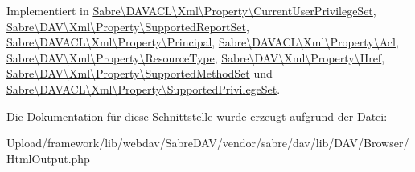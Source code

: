 Implementiert in \mbox{\hyperlink{class_sabre_1_1_d_a_v_a_c_l_1_1_xml_1_1_property_1_1_current_user_privilege_set_ab15d2dbb957c67a5a58b5d93f4a47bfd}{Sabre\textbackslash{}\+D\+A\+V\+A\+C\+L\textbackslash{}\+Xml\textbackslash{}\+Property\textbackslash{}\+Current\+User\+Privilege\+Set}}, \mbox{\hyperlink{class_sabre_1_1_d_a_v_1_1_xml_1_1_property_1_1_supported_report_set_a3775a63feb6a3353e4f00bea05f66fad}{Sabre\textbackslash{}\+D\+A\+V\textbackslash{}\+Xml\textbackslash{}\+Property\textbackslash{}\+Supported\+Report\+Set}}, \mbox{\hyperlink{class_sabre_1_1_d_a_v_a_c_l_1_1_xml_1_1_property_1_1_principal_a4b9de9a2e6d5a1cdb08a9da3199a1cca}{Sabre\textbackslash{}\+D\+A\+V\+A\+C\+L\textbackslash{}\+Xml\textbackslash{}\+Property\textbackslash{}\+Principal}}, \mbox{\hyperlink{class_sabre_1_1_d_a_v_a_c_l_1_1_xml_1_1_property_1_1_acl_a8540f16d374d6ce80a2555ddcb50468e}{Sabre\textbackslash{}\+D\+A\+V\+A\+C\+L\textbackslash{}\+Xml\textbackslash{}\+Property\textbackslash{}\+Acl}}, \mbox{\hyperlink{class_sabre_1_1_d_a_v_1_1_xml_1_1_property_1_1_resource_type_a05091dcffe3fd53144b2ba464b569cfc}{Sabre\textbackslash{}\+D\+A\+V\textbackslash{}\+Xml\textbackslash{}\+Property\textbackslash{}\+Resource\+Type}}, \mbox{\hyperlink{class_sabre_1_1_d_a_v_1_1_xml_1_1_property_1_1_href_a893c9969f099f1b54c0f852b0684c28f}{Sabre\textbackslash{}\+D\+A\+V\textbackslash{}\+Xml\textbackslash{}\+Property\textbackslash{}\+Href}}, \mbox{\hyperlink{class_sabre_1_1_d_a_v_1_1_xml_1_1_property_1_1_supported_method_set_afcab0ef1e0a50669a6591f27ae0f75b3}{Sabre\textbackslash{}\+D\+A\+V\textbackslash{}\+Xml\textbackslash{}\+Property\textbackslash{}\+Supported\+Method\+Set}} und \mbox{\hyperlink{class_sabre_1_1_d_a_v_a_c_l_1_1_xml_1_1_property_1_1_supported_privilege_set_ade307197eaf785d53793154ac0a0f2e6}{Sabre\textbackslash{}\+D\+A\+V\+A\+C\+L\textbackslash{}\+Xml\textbackslash{}\+Property\textbackslash{}\+Supported\+Privilege\+Set}}.



Die Dokumentation für diese Schnittstelle wurde erzeugt aufgrund der Datei\+:\begin{DoxyCompactItemize}
\item 
Upload/framework/lib/webdav/\+Sabre\+D\+A\+V/vendor/sabre/dav/lib/\+D\+A\+V/\+Browser/Html\+Output.\+php\end{DoxyCompactItemize}
